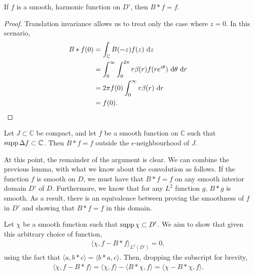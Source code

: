 \begin{lemma}
	If $ f $ is a smooth, harmonic function on $ D' $, then $ B * f = f $.
	\begin{proof}
		Translation invariance allows us to treat only the case where $ z=0 $. In
		this scenario,
		\begin{align*}
			B * f ( 0 ) & = \int_{\mathbb{C}}{B ( -z )f ( z )}\operatorname{\, d\!}{z}               \\
			            & = \int_{0}^{\infty}{\int_{0}^{2 \pi}{r \beta ( r )f ( r
			e^{i \theta})}\operatorname{\, d\!}{\theta}}\operatorname{\, d\!}{r}                                        \\
			            & = 2 \pi f ( 0 )\int_{0}^{\infty}{r \beta ( r )}\operatorname{\, d\!}{r}    \\
			            & = f ( 0 ).
		\end{align*}
	\end{proof}
\end{lemma}

\begin{corollary}\label{cor:B-convolution}
	Let $ J \subset \mathbb{C} $ be compact, and let $ f $ be a smooth function
	on $ \mathbb{C} $ such that $ \operatorname{supp} \Delta f \subset \mathbb{C} $. Then $
		B*f = f $ outside the $ \epsilon $-neighbourhood of $ J $.
\end{corollary}

At this point, the remainder of the argument is clear. We can combine the
previous lemma, with what we know about the convolution as follows. If the
function $ f $ is smooth on $ D $, we must have that $ B * f = f $ on any smooth
interior domain $ D' $ of $ D $. Furthermore, we know that for any $ L^{2} $
function $ g $, $ B*g $ is smooth. As a result, there is an equivalence between
proving the smoothness of $ f $ in $ D' $ and showing that $ B*f=f $ in this
domain.

Let $ \chi $ be a smooth function such that $ \operatorname{supp} \chi \subset D' $. We aim to
show that given this arbitrary choice of function,
\begin{align*}
	\langle \chi, f - B*f \rangle_{L^{2}( D' )}=0,
\end{align*}
using the fact that $ \langle a,
	b*c \rangle = \langle b*a, c \rangle $. Then, dropping the subscript for
brevity,
\begin{align*}
	\langle \chi, f-B*f \rangle = \langle \chi,f \rangle - \langle B*\chi, f
	\rangle = \langle \chi-B*\chi,f \rangle.
\end{align*}

